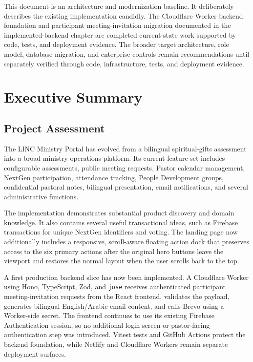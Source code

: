 \documentclass[11pt,a4paper,oneside]{report}
\begin{document}
\begin{warningbox}
This document is an architecture and modernization baseline. It deliberately describes the existing implementation candidly. The Cloudflare Worker backend foundation and participant meeting-invitation migration documented in the implemented-backend chapter are completed current-state work supported by code, tests, and deployment evidence. The broader target architecture, role model, database migration, and enterprise controls remain recommendations until separately verified through code, infrastructure, tests, and deployment evidence.
\end{warningbox}

\pagestyle{plain}
\tableofcontents
\clearpage
\listoffigures
\clearpage
\listoftables
\clearpage
\pagestyle{fancy}

\chapter{Executive Summary}

\section{Project Assessment}

The LINC Ministry Portal has evolved from a bilingual spiritual-gifts assessment into a broad ministry operations platform. Its current feature set includes configurable assessments, public meeting requests, Pastor calendar management, NextGen participation, attendance tracking, People Development groups, confidential pastoral notes, bilingual presentation, email notifications, and several administrative functions.

The implementation demonstrates substantial product discovery and domain knowledge. It also contains several useful transactional ideas, such as Firebase transactions for unique NextGen identifiers and voting. The landing page now additionally includes a responsive, scroll-aware floating action dock that preserves access to the six primary actions after the original hero buttons leave the viewport and restores the normal layout when the user scrolls back to the top.

A first production backend slice has now been implemented. A Cloudflare Worker using Hono, TypeScript, Zod, and \texttt{jose} receives authenticated participant meeting-invitation requests from the React frontend, validates the payload, generates bilingual English/Arabic email content, and calls Brevo using a Worker-side secret. The frontend continues to use its existing Firebase Authentication session, so no additional login screen or pastor-facing authentication step was introduced. Vitest tests and GitHub Actions protect the backend foundation, while Netlify and Cloudflare Workers remain separate deployment surfaces.
\end{document}
